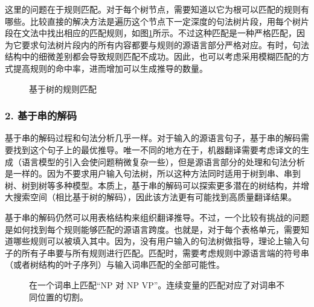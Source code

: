 \parinterval 这里的问题在于规则匹配。对于每个树节点，需要知道以它为根可以匹配的规则有哪些。比较直接的解决方法是遍历这个节点下一定深度的句法树片段，用每个树片段在文法中找出相应的匹配规则，如图\ref{fig:8-42}所示。不过这种匹配是一种严格匹配，因为它要求句法树片段内的所有内容都要与规则的源语言部分严格对应。有时，句法结构中的细微差别都会导致规则匹配不成功。因此，也可以考虑采用模糊匹配的方式提高规则的命中率，进而增加可以生成推导的数量。

\begin{figure}[htp]
\centering

\setlength{\abovecaptionskip}{-0.5em}
\caption{基于树的规则匹配}
\label{fig:8-42}
\end{figure}


\subsubsection{2. 基于串的解码}

\parinterval 基于串的解码过程和句法分析几乎一样。对于输入的源语言句子，基于串的解码需要找到这个句子上的最优推导。唯一不同的地方在于，机器翻译需要考虑译文的生成（语言模型的引入会使问题稍微复杂一些），但是源语言部分的处理和句法分析是一样的。因为不要求用户输入句法树，所以这种方法同时适用于树到串、串到树、树到树等多种模型。本质上，基于串的解码可以探索更多潜在的树结构，并增大搜索空间（相比基于树的解码），因此该方法更有可能找到高质量翻译结果。

\parinterval 基于串的解码仍然可以用表格结构来组织翻译推导。不过，一个比较有挑战的问题是如何找到每个规则能够匹配的源语言跨度。也就是，对于每个表格单元，需要知道哪些规则可以被填入其中。因为，没有用户输入的句法树做指导，理论上输入句子的所有子串要与所有规则进行匹配。匹配时，需要考虑规则中源语言端的符号串（或者树结构的叶子序列）与输入词串匹配的全部可能性。

\begin{figure}[htp]
\centering

\caption{在一个词串上匹配“NP 对 NP VP”。连续变量的匹配对应了对词串不同位置的切割。}
\label{fig:8-43}
\end{figure}

